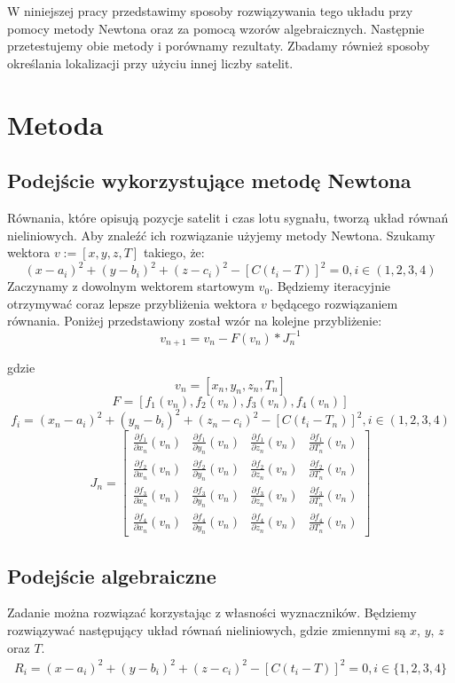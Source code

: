 \documentclass[]{mwart}
\theoremstyle{definition}
\begin{document}
W niniejszej pracy przedstawimy sposoby rozwiązywania tego układu przy pomocy metody Newtona oraz za pomocą wzorów algebraicznych. Następnie przetestujemy obie metody i porównamy rezultaty. Zbadamy również sposoby określania lokalizacji przy użyciu innej liczby satelit.

\section*{Metoda}
	\subsection*{Podejście wykorzystujące metodę Newtona}
Równania, które opisują pozycje satelit i czas lotu sygnału, tworzą układ równań nieliniowych. Aby znaleźć ich rozwiązanie użyjemy metody Newtona. Szukamy wektora $v := [x, y, z, T]$ takiego, że:
$$ (x-a_i)^2 + (y-b_i)^2 + (z-c_i)^2-[C(t_i-T)]^2 = 0, i \in (1,2,3,4) $$
Zaczynamy z dowolnym wektorem startowym $v_0$. Będziemy iteracyjnie otrzymywać coraz lepsze przybliżenia wektora $v$ będącego rozwiązaniem równania. Poniżej przedstawiony został wzór na kolejne przybliżenie:
$$ v_{n+1} = v_n - F(v_n)*J_n^{-1} $$

gdzie
$$v_n = [x_n, y_n, z_n, T_n]$$
$$F = [f_1(v_n), f_2(v_n), f_3(v_n), f_4(v_n)]$$
$$ f_i = (x_n-a_i)^2 + (y_n-b_i)^2 + (z_n-c_i)^2-[C(t_i-T_n)]^2, i \in (1,2,3,4) $$
$$
J_n=
\begin{bmatrix}
    \frac{\partial f_1}{\partial x_n}(v_n)       & \frac{\partial f_1}{\partial y_n}(v_n) & \frac{\partial f_1}{\partial z_n}(v_n) & \frac{\partial f_1}{\partial T_n}(v_n) \\
    \frac{\partial f_2}{\partial x_n}(v_n)       & \frac{\partial f_2}{\partial y_n}(v_n) & \frac{\partial f_2}{\partial z_n}(v_n) & \frac{\partial f_2}{\partial T_n}(v_n) \\
    \frac{\partial f_3}{\partial x_n}(v_n)       & \frac{\partial f_3}{\partial y_n}(v_n) & \frac{\partial f_3}{\partial z_n}(v_n) & \frac{\partial f_3}{\partial T_n}(v_n) \\
    \frac{\partial f_4}{\partial x_n}(v_n)       & \frac{\partial f_4}{\partial y_n}(v_n) & \frac{\partial f_4}{\partial z_n}(v_n) & \frac{\partial f_4}{\partial T_n}(v_n)
\end{bmatrix}
$$

\subsection*{Podejście algebraiczne}
Zadanie można rozwiązać korzystając z własności wyznaczników. Będziemy rozwiązywać następujący układ równań nieliniowych, gdzie zmiennymi są $x$, $y$, $z$ oraz $T$.
\begin{align*}
	R_i = (x - a_i)^2 + (y - b_i)^2 + (z - c_i)^2 - [C(t_i - T)]^2 = 0, i \in \{1,2,3,4\}
\end{align*}
\end{document}
